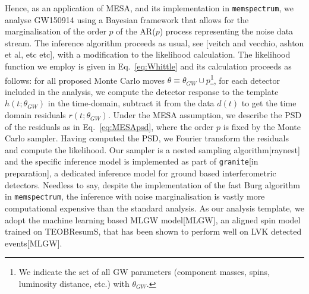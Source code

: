 \documentclass{aa}
\begin{document}
Hence, as an application of MESA, and its implementation in \texttt{memspectrum}, we analyse GW150914\cite{} using a Bayesian framework that allows for the marginalisation of the order  $p$ of the AR($p$) process representing the noise data stream. The inference algorithm proceeds as usual, see \cite{}[veitch and vecchio, ashton et al, etc etc], with a modification to the likelihood calculation. The likelihood function we employ is given in Eq.~\eqref{eq:Whittle} and its calculation proceeds as follows: for all proposed Monte Carlo moves $\theta\equiv\theta_{GW}\cup p$\footnote{We indicate the set of all GW parameters (component masses, spins, luminosity distance, etc.) with $\theta_{GW}$.}, for each detector included in the analysis, we compute the detector response to the template $h(t;\theta_{GW})$ in the time-domain, subtract it from the data $d(t)$ to get the time domain residuals $r(t;\theta_{GW})$. Under the MESA assumption, we describe the PSD of the residuals as in Eq.~\eqref{eq:MESApsd}, where the order $p$ is fixed by the Monte Carlo sampler. Having computed the PSD, we Fourier transform the residuals and compute the likelihood. Our sampler is a nested sampling algorithm\cite{}[raynest] and the specific inference model is implemented as part of \texttt{granite}\cite{}[in preparation], a dedicated inference model for ground based interferometric detectors. Needless to say, despite the implementation of the fast Burg algorithm in \texttt{memspectrum}, the inference with noise marginalisation is vastly more computational expensive than the standard analysis. As our analysis template, we adopt the machine learning based MLGW model\cite{}[MLGW], an aligned spin model trained on TEOBResumS\cite{}, that has been shown to perform well on LVK detected events\cite{}[MLGW]. 
\end{document}
